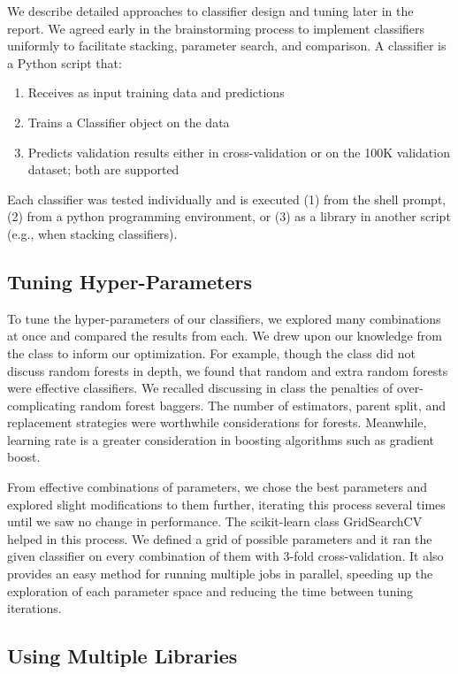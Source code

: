 \documentclass{article}
\begin{document}
We describe detailed approaches to classifier design and tuning later in the report. 
We agreed early in the brainstorming process to implement classifiers uniformly to facilitate stacking, parameter search, and comparison. 
A classifier is a Python script that: 

\begin{enumerate}
\item Receives as input training data and predictions
\item Trains a Classifier object on the data
\item Predicts validation results either in cross-validation or on the 100K validation dataset; both are supported 
\end{enumerate}

Each classifier was tested individually and is executed (1) from the shell prompt, (2) from a python programming environment, or (3) as a library in another script (e.g., when stacking classifiers).

\subsection{Tuning Hyper-Parameters}
\label{tuning_parameters}

To tune the hyper-parameters of our classifiers, we explored many combinations at once and compared the results from each.
We drew upon our knowledge from the class to inform our optimization. 
For example, though the class did not discuss random forests in depth, we found that random and extra random forests were effective classifiers.
We recalled discussing in class the penalties of over-complicating random forest baggers.
The number of estimators, parent split, and replacement strategies were worthwhile considerations for forests.
Meanwhile, learning rate is a greater consideration in boosting algorithms such as gradient boost.

From effective combinations of parameters, we chose the best parameters and explored slight modifications to them further, iterating this process several times until we saw no change in performance.
The scikit-learn class GridSearchCV helped in this process.
We defined a grid of possible parameters and it ran the given classifier on every combination of them with 3-fold cross-validation.
It also provides an easy method for running multiple jobs in parallel, speeding up the exploration of each parameter space and reducing the time between tuning iterations.

\subsection{Using Multiple Libraries}
\label{multiple_libraries}
\end{document}
